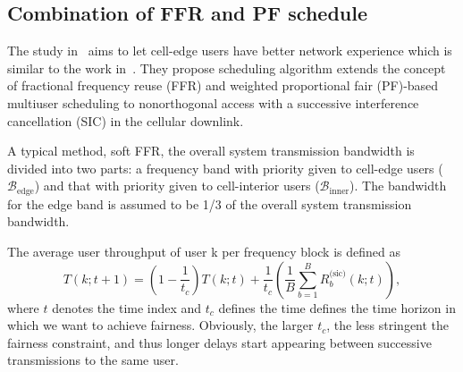 \subsection{Combination of FFR and PF schedule}
\label{sec_ffr_pf}
The study in~\cite{cite_docomo3} aims to let cell-edge users have better network experience 
which is similar to the work in~\cite{cite_docomo2}. 
They propose scheduling algorithm extends the concept of fractional frequency reuse (FFR) and 
weighted proportional fair (PF)-based multiuser scheduling to nonorthogonal access with a 
successive interference cancellation (SIC) in the cellular downlink. 

A typical method, soft FFR, the overall system transmission bandwidth is divided into two parts: 
a frequency band with priority given to cell-edge users ($\mathcal{B}_{\text{edge}}$) and that 
with priority given to cell-interior users ($\mathcal{B}_{\text{inner}}$). The bandwidth for the
edge band is assumed to be 1/3 of the overall system transmission bandwidth.

The average user throughput of user k per frequency block is defined as
\begin{equation}
\label{eq_avg_throughput}
T(k;t+1)=\left(1-\frac{1}{t_c}\right)T(k;t)+\frac{1}{t_c}\left(\frac{1}{B}\sum_{b=1}^{B} R^{\text{(sic)}}_b(k;t)\right),
\end{equation}
where $t$ denotes the time index and $t_c$ defines the time defines the time horizon in which we want
to achieve fairness. Obviously, the larger $t_c$, the less stringent
the fairness constraint, and thus longer delays start appearing
between successive transmissions to the same user.

